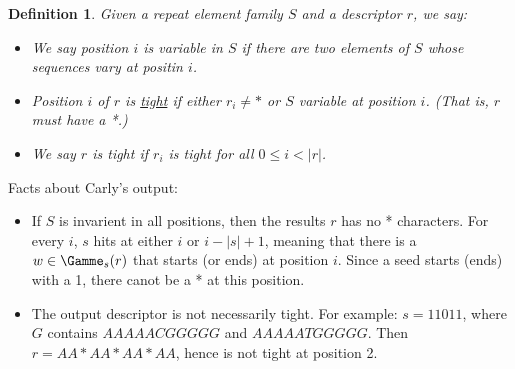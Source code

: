 \documentclass{article}
\newcommand{\und}{\underline}
\newtheorem{definition}{Definition}
\begin{document}
\begin{definition}
Given a repeat element family $S$ and a descriptor $r$, we say:
\begin{itemize}
\item We say position $i$ is variable in $S$ if there are two elements
  of $S$ whose sequences vary at positin $i$.
\item Position $i$ of $r$ is \und{tight} if either $r_i \neq *$ or
  $S$ variable at position $i$.  (That is, $r$ must have a *.)
\item We say $r$ is tight if $r_i$ is tight for all $0 \leq i < |r|$.
\end{itemize}
\end{definition}

Facts about Carly's output:
\begin{itemize}
\item If $S$ is invarient in all positions, then the results $r$ has
  no * characters.  For every $i$, $s$ hits at either $i$ or
  $i-|s|+1$, meaning that there is a $w \in \Gamme_s(r)$ that starts
  (or ends) at position $i$.  Since a seed starts (ends) with a 1,
  there canot be a * at this position.
\item The output descriptor is not necessarily tight.  For example:
  $s=11011$, where $G$ contains $AAAAACGGGGG$ and $AAAAATGGGGG$.  Then
  $r = AA*AA*AA*AA$, hence is not tight at position 2.
\end{itemize}




  
    
  
\end{document}
